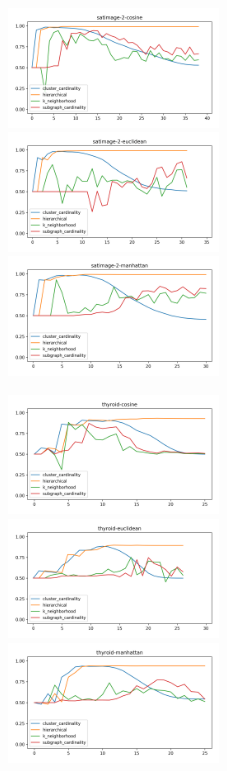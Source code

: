 \begin{figure}[!t]
\centering
\includegraphics[width=2.2in]{kdd/static/auc_vs_depth/satimage-2-cosine.png}
\includegraphics[width=2.2in]{kdd/static/auc_vs_depth/satimage-2-euclidean.png}
\includegraphics[width=2.2in]{kdd/static/auc_vs_depth/satimage-2-manhattan.png}

\includegraphics[width=2.2in]{kdd/static/auc_vs_depth/thyroid-cosine.png}
\includegraphics[width=2.2in]{kdd/static/auc_vs_depth/thyroid-euclidean.png}
\includegraphics[width=2.2in]{kdd/static/auc_vs_depth/thyroid-manhattan.png}


\end{figure}
